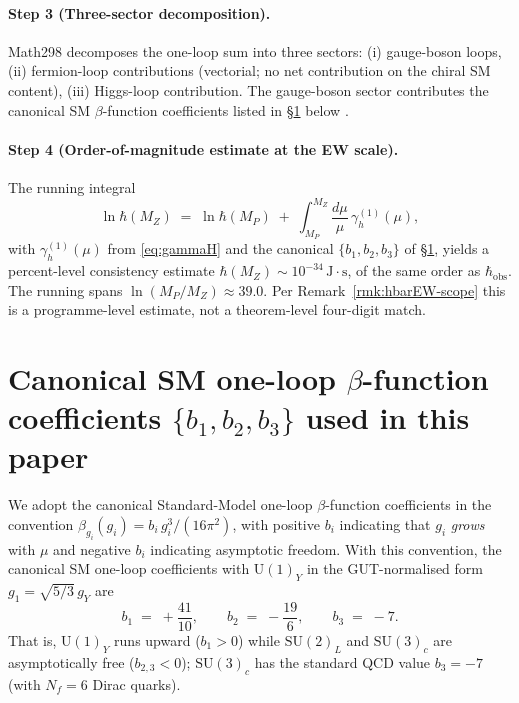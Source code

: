 \paragraph{Step 3 (Three-sector decomposition).}
Math298 decomposes the one-loop sum into three sectors: (i) gauge-boson
loops, (ii) fermion-loop contributions (vectorial; no net contribution
on the chiral SM content), (iii) Higgs-loop contribution. The
gauge-boson sector contributes the canonical SM $\beta$-function
coefficients listed in \S\ref{sec:beta} below \cite{Math298}.

\paragraph{Step 4 (Order-of-magnitude estimate at the EW scale).}
The running integral
\begin{equation}\label{eq:running-int}
  \ln\hbar(M_Z)
  \;=\;
  \ln\hbar(M_P)
  \;+\;
  \int_{M_P}^{M_Z} \frac{d\mu}{\mu}\,\gamma_h^{(1)}(\mu),
\end{equation}
with $\gamma_h^{(1)}(\mu)$ from \eqref{eq:gammaH} and the canonical
$\{b_1,b_2,b_3\}$ of \S\ref{sec:beta}, yields a percent-level
consistency estimate $\hbar(M_Z) \sim 10^{-34}\,\mathrm{J{\cdot}s}$,
of the same order as $\hbar_{\mathrm{obs}}$. The running spans
$\ln(M_P/M_Z)\approx 39.0$. Per
Remark~\ref{rmk:hbarEW-scope} this is a programme-level estimate,
not a theorem-level four-digit match.

\section{Canonical SM one-loop $\beta$-function coefficients
$\{b_1, b_2, b_3\}$ used in this paper}\label{sec:beta}

We adopt the canonical Standard-Model one-loop $\beta$-function
coefficients in the convention
$\beta_{g_i}(g_i) = b_i\,g_i^{3}/(16\pi^2)$, with positive $b_i$
indicating that $g_i$ \emph{grows} with $\mu$ and negative $b_i$
indicating asymptotic freedom. With this convention, the canonical
SM one-loop coefficients with $\mathrm{U}(1)_Y$ in the GUT-normalised
form
$g_1 = \sqrt{5/3}\,g_Y$ are
\begin{equation}\label{eq:b-canonical}
  \boxed{\;
    b_1 \;=\; +\frac{41}{10},
    \qquad
    b_2 \;=\; -\frac{19}{6},
    \qquad
    b_3 \;=\; -7.
  \;}
\end{equation}
That is, $\mathrm{U}(1)_Y$ runs upward ($b_1 > 0$) while
$\mathrm{SU}(2)_L$ and $\mathrm{SU}(3)_c$ are asymptotically free
($b_{2,3} < 0$); $\mathrm{SU}(3)_c$ has the standard QCD value
$b_3 = -7$ (with $N_f = 6$ Dirac quarks).

